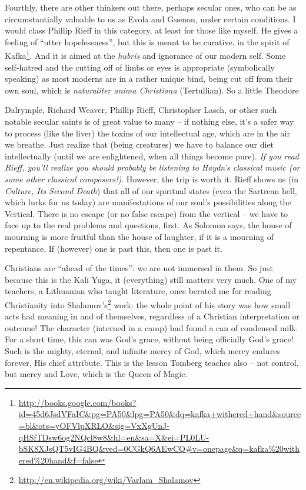 Fourthly, there are other thinkers out there, perhaps secular ones, who can be as circumstantially valuable to us as Evola and Guenon, under certain conditions. I would class Phillip Rieff in this category, at least for those like myself. He gives a feeling of ``utter hopelessness'', but this is meant to be curative, in the spirit of Kafka\footnote{\url{http://books.google.com/books?id=45d6JsdVFaIC\&pg=PA50\&lpg=PA50\&dq=kafka+withered+hand\&source=bl\&ots=yOFVlpXRLO\&sig=VxXgUnJ-qHSfTDsw6og2NQcl8w8\&hl=en\&sa=X\&ei=PL0LU-bSK8XJsQT5vIG4BQ\&ved=0CGkQ6AEwCQ\#v=onepage\&q=kafka\%20withered\%20hand\&f=false}}. And it is aimed at the \emph{hubris} and ignorance of our modern self. Some self-hatred and the cutting off of limbs or eyes is appropriate (symbolically speaking) as most moderns are in a rather unique bind, being cut off from their own soul, which is
\emph{naturaliter anima Christiana} (Tertullian). So a little Theodore

Dalrymple, Richard Weaver, Phillip Rieff, Christopher Lasch, or other such notable secular saints is of great value to many -- if nothing else, it's a safer way to process (like the liver) the toxins of our intellectual age, which are in the air we breathe. Just realize that (being creatures) we have to balance our diet intellectually (until we are enlightened, when all things become pure). \emph{If you read Rieff, you'll realize you should probably be listening to Haydn's classical music (or some other classical composers!)}. However, the trip is worth it. Rieff shows us (in \emph{Culture, Its Second Death}) that all of our spiritual states (even the Sartrean hell, which lurks for us today) are manifestations of our soul's possibilities along the Vertical. There is no escape (or no false escape) from the vertical -- we have to face up to the real problems and questions, first. As Solomon says, the house of mourning is more fruitful than the house of laughter, if it is a mourning of repentance. If (however) one is past this, then one is past it.

Christians are ``ahead of the times'': we are not immersed in them. So just because this is the Kali Yuga, it (everything) still matters very much. One of my teachers, a Lithuanian who taught literature, once berated me for reading Christianity into Shalamov's\footnote{\url{http://en.wikipedia.org/wiki/Varlam_Shalamov}} work: the whole point of his story was how small acts had meaning in and of themselves, regardless of a Christian interpretation or outcome! The character (interned in a camp) had found a can of condensed milk. For a short time, this can was God's grace, without being officially God's grace! Such is the mighty, eternal, and infinite mercy of God, which mercy endures forever, His chief attribute. This is the lesson Tomberg teaches also -- not control, but mercy and Love, which is the Queen of Magic.

